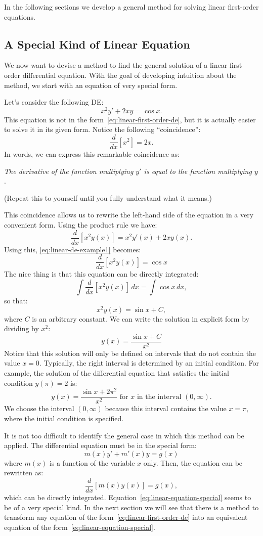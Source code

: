 \documentclass{ximera}
\begin{document}
In the following sections we develop a general method for solving linear first-order equations.
 
\subsection*{A Special Kind of Linear Equation}
We now want to devise a method to find the general solution of a linear first order differential equation. With the goal of developing intuition about the method, we start with an equation of very special form.
 
Let's consider the following DE:
\begin{equation}
\label{eq:linear-de-example1}
x^2y'+2xy=\cos x.
\end{equation}
This equation is not in the form~\ref{eq:linear-first-order-de}, but it is actually easier to solve it in its given form. Notice the following ``coincidence'':
\[
\frac{d}{dx}[x^2]=2x.
\]
In words, we can express this remarkable coincidence as:
 
\begin{center}
\emph{The derivative of the function multiplying $y'$ is equal to the function multiplying $y$}.
\end{center}
 
(Repeat this to yourself until you fully understand what it means.)
 
This coincidence allows us to rewrite the left-hand side of the equation in a very convenient form. Using the product rule we have:
\[
\frac{d}{dx}\left[x^2y(x)\right]=x^2y'(x)+2xy(x).
\]
Using this, \ref{eq:linear-de-example1} becomes:
\[
\frac{d}{dx}\left[x^2y(x)\right]=\cos x
\]
The nice thing is that this equation can be directly integrated:
\[
\int \frac{d}{dx}\left[x^2y(x)\right]\, dx = \int \cos x\,dx,
\]
so that:
\[
x^2y(x)=\sin x + C,
\]
where $C$ is an arbitrary constant. We can write the solution in explicit form by dividing by $x^2$:
\[
y(x)=\frac{\sin x + C}{x^2}
\]
Notice that this solution will only be defined on intervals that do not contain the value $x=0$. Typically, the right interval is determined by an initial condition. For example, the solution of the differential equation that satisfies the initial condition $y(\pi)=2$ is:
\[
y(x)=\frac{\sin x + 2\pi^2}{x^2}\text{ for $x$ in the interval $(0,\infty)$}.
\]
We choose the interval $(0,\infty)$ because this interval contains the value $x=\pi$, where the initial condition is specified.
 
It is not too difficult to identify the general case in which this method can be applied. The differential equation must be in the special form:
\begin{equation}
\label{eq:linear-equation-special}
m(x)y'+m'(x)y=g(x)
\end{equation}
where $m(x)$ is a function of the variable $x$ only. Then, the equation can be rewritten as:
\[
\frac{d}{dx}\left[m(x)y(x)\right]=g(x),
\]
which can be directly integrated. Equation~\ref{eq:linear-equation-special} seems to be of a very special kind. In the next section we will see that there is a method to transform any equation of the form~\ref{eq:linear-first-order-de} into an equivalent equation of the form~\ref{eq:linear-equation-special}.
 
\end{document}
